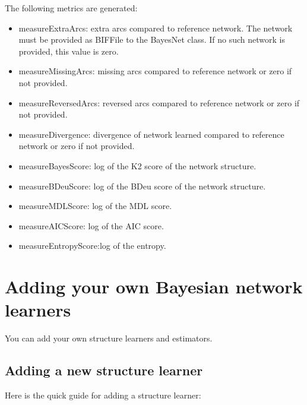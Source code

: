 \documentclass[a4paper]{article}
\begin{document}
The following metrics are generated:
\begin{itemize}
\item measureExtraArcs: extra arcs compared to reference network. The network must be
provided as BIFFile to the BayesNet class. If no such network is provided, this value is zero.
\item measureMissingArcs: missing arcs compared to reference network or zero if not provided.
\item measureReversedArcs: reversed arcs compared to reference network or zero if not provided.
\item measureDivergence: divergence of network learned compared to reference network or zero if not provided.
\item measureBayesScore: log of the K2 score of the network structure.
\item measureBDeuScore: log of the BDeu score of the network structure.
\item measureMDLScore: log of the MDL score.
\item measureAICScore: log of the AIC score.
\item measureEntropyScore:log of the entropy.
\end{itemize}


\section{Adding your own Bayesian network learners}

You can add your own structure learners and estimators.

\subsection*{Adding a new structure learner}

Here is the quick guide for adding a structure learner:
\end{document}

